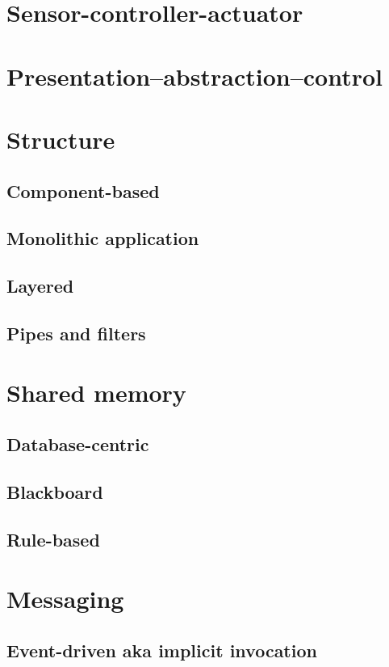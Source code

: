 \documentclass{book}
\newcounter{subpart}
\begin{document}
\chapter{Sensor-controller-actuator}
\chapter{Presentation–abstraction–control}



\chapter{Structure}

\section{Component-based}
\section{Monolithic application}
\section{Layered}
\section{Pipes and filters}

\chapter{Shared memory}

\section{Database-centric}
\section{Blackboard}
\section{Rule-based}
    
\chapter{Messaging}

\section{Event-driven aka implicit invocation}
\end{document}
